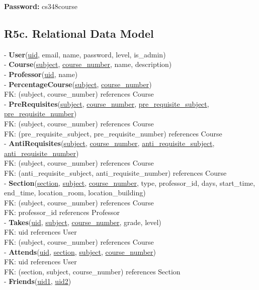 \documentclass[12pt, a4paper]{article}
\begin{document}
\textbf{Password:} cs348course
\subsection*{R5c. Relational Data Model}
- \textbf{User}(\underline{uid}, email, name, password, level, is\_admin)\\
- \textbf{Course}(\underline{subject}, \underline{course\_number}, name, description)\\
- \textbf{Professor}(\underline{uid}, name)\\
- \textbf{PercentageCourse}(\underline{subject}, \underline{course\_number})\\
FK: (subject, course\_number) references Course\\
- \textbf{PreRequisites}(\underline{subject}, \underline{course\_number}, \underline{pre\_requisite\_subject}, \underline{pre\_requisite\_number})\\
FK: (subject, course\_number) references Course\\
FK: (pre\_requisite\_subject, pre\_requisite\_number) references Course\\
- \textbf{AntiRequisites}(\underline{subject}, \underline{course\_number}, \underline{anti\_requisite\_subject}, \underline{anti\_requisite\_number})\\
FK: (subject, course\_number) references Course\\
FK: (anti\_requisite\_subject, anti\_requisite\_number) references Course\\
- \textbf{Section}(\underline{section}, \underline{subject}, \underline{course\_number}, type, professor\_id, days, start\_time, end\_time, location\_room, location\_building)\\
FK: (subject, course\_number) references Course\\
FK: professor\_id references Professor\\
- \textbf{Takes}(\underline{uid}, \underline{subject}, \underline{course\_number}, grade, level)\\
FK: uid references User\\
FK: (subject, course\_number) references Course\\
- \textbf{Attends}(\underline{uid}, \underline{section}, \underline{subject}, \underline{course\_number})\\
FK: uid references User\\
FK: (section, subject, course\_number) references Section\\
- \textbf{Friends}(\underline{uid1}, \underline{uid2})\\
\end{document}

